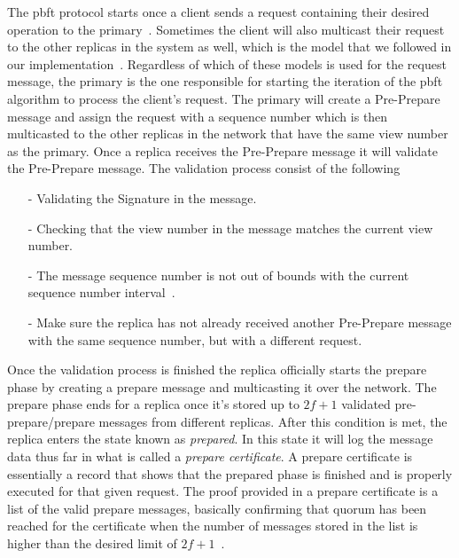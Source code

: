 The \ac{pbft} protocol starts once a client sends a request containing their desired operation to the primary~\cite[p.~4]{PAPER:OGPBFT}. Sometimes the client will also multicast their request to the other replicas in the system as well, which is the model that we followed in our implementation~\cites[p.~2]{PAPER:DPBFT}[p.~406]{PAPER:PBFTRecovery}[p.~258]{BOOK:BuildDepDistSyst}. Regardless of which of these models is used for the request message, the primary is the one responsible for starting the iteration of the \ac{pbft} algorithm to process the client's request. The primary will create a Pre-Prepare message and assign the request with a sequence number which is then multicasted to the other replicas in the network that have the same view number as the primary. Once a replica receives the Pre-Prepare message it will validate the Pre-Prepare message. The validation process consist of the following~\cites[p.~4]{PAPER:OGPBFT} {SLIDES:PBFT}[p.~259]{BOOK:BuildDepDistSyst}
\begin{itemize}
	\item[-]Validating the Signature in the message.
	\item[-]Checking that the view number in the message matches the current view number.
	\item[-]The message sequence number is not out of bounds with the current sequence number interval~\cites{SLIDES:PBFT}[p.~4]{PAPER:OGPBFT}.
	\item[-]Make sure the replica has not already received another Pre-Prepare message with the same sequence number, but with a different request.
\end{itemize}
Once the validation process is finished the replica officially starts the prepare phase by creating a prepare message and multicasting it over the network. The prepare phase ends for a replica once it's stored up to $2f+1$ validated pre-prepare/prepare messages from different replicas. After this condition is met, the replica enters the state known as \emph{prepared}. In this state it will log the message data thus far in what is called a \emph{prepare certificate}. A prepare certificate is essentially a record that shows that the prepared phase is finished and is properly executed for that given request. The proof provided in a prepare certificate is a list of the valid prepare messages, basically confirming that quorum has been reached for the certificate when the number of messages stored in the list is higher than the desired limit of $2f + 1$~\cites[p.~408]{PAPER:PBFTRecovery}[p.~457]{BOOK:MVstandver3}.
